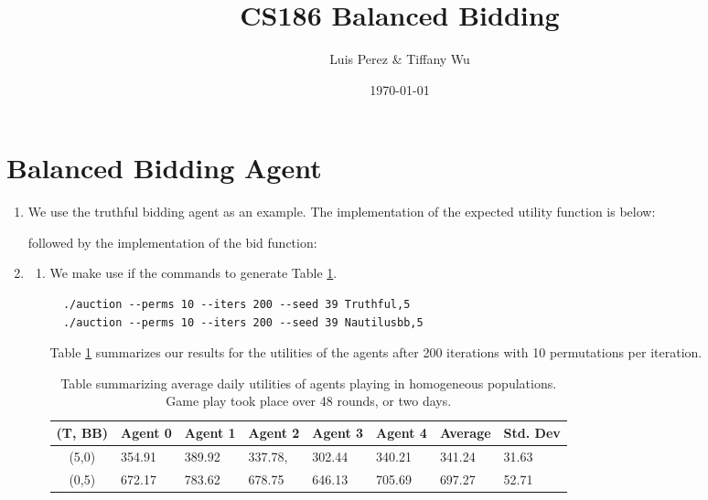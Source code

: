 \documentclass[11pt]{article}
\title{CS186 Balanced Bidding}
\author{Luis Perez \& Tiffany Wu}
\date{\today}
\begin{document}
\maketitle

\section*{Balanced Bidding Agent}
\begin{enumerate}
\item We use the truthful bidding agent as an example. The  implementation of the expected utility function is below:

  
  

  followed by the implementation of the bid function:

  
  
\item 
  \begin{enumerate}
  \item  We make use if the commands to generate Table \ref{tab:bb_tt}.
  \begin{lstlisting}
  ./auction --perms 10 --iters 200 --seed 39 Truthful,5
  ./auction --perms 10 --iters 200 --seed 39 Nautilusbb,5
  \end{lstlisting}
  Table \ref{tab:bb_tt} summarizes our results for the utilities of the agents after 200 iterations with 10 permutations per iteration.
    
    \begin{table}[h!]
      \centering
        \begin{tabular}{clllllll}
        \hline
        (T, BB) & Agent 0 & Agent 1 & Agent 2 & Agent 3 & Agent 4 & Average & Std. Dev     \\ \hline
        (5,0)   & 354.91 & 389.92 & 337.78, & 302.44 & 340.21 & 341.24 & 31.63 \\
        (0,5)   & 672.17   & 783.62  & 678.75  & 646.13  & 705.69 & 697.27 & 52.71 \\ \hline
        \end{tabular}
        \caption{Table summarizing average daily utilities of agents playing in homogeneous populations. Game play took place over 48 rounds, or two days.}
        \label{tab:bb_tt}
      \end{table}


\end{enumerate}
\end{enumerate}
\end{document}
